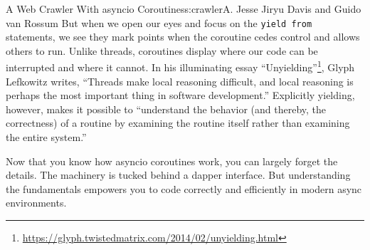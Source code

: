 \begin{aosachapter}{A Web Crawler With asyncio Coroutines}{s:crawler}{A. Jesse Jiryu Davis and Guido van Rossum}
But when we open our eyes and focus on the \texttt{yield from}
statements, we see they mark points when the coroutine cedes control and
allows others to run. Unlike threads, coroutines display where our code
can be interrupted and where it cannot. In his illuminating essay
``Unyielding''\footnote{\url{https://glyph.twistedmatrix.com/2014/02/unyielding.html}},
Glyph Lefkowitz writes, ``Threads make local reasoning difficult, and
local reasoning is perhaps the most important thing in software
development.'' Explicitly yielding, however, makes it possible to
``understand the behavior (and thereby, the correctness) of a routine by
examining the routine itself rather than examining the entire system.''

Now that you know how asyncio coroutines work, you can largely forget
the details. The machinery is tucked behind a dapper interface. But
understanding the fundamentals empowers you to code correctly and
efficiently in modern async environments.

\end{aosachapter}
